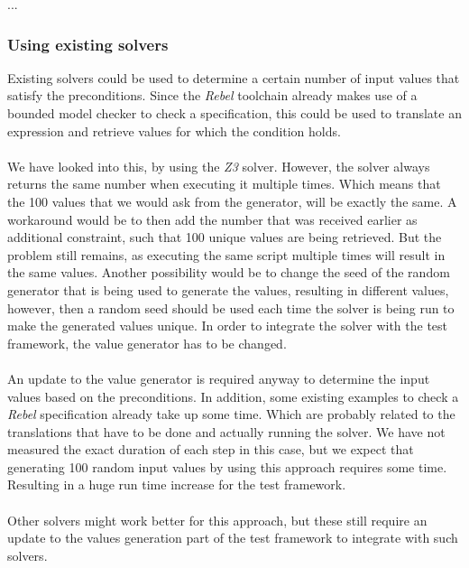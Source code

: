 ...
\subsubsection{Using existing solvers}
Existing solvers could be used to determine a certain number of input values
that satisfy the preconditions. Since the \textit{Rebel} toolchain already makes
use of a bounded model checker to check a specification, this could be used to
translate an expression and retrieve values for which the condition holds.\\
\\
We have looked into this, by using the \textit{Z3} solver. However, the solver
always returns the same number when executing it multiple times. Which means
that the 100 values that we would ask from the generator, will be exactly the
same. A workaround would be to then add the number that was received earlier as
additional constraint, such that 100 unique values are being retrieved. But the
problem still remains, as executing the same script multiple times will result in
the same values. Another possibility would be to change the seed of the random generator that is being
used to generate the values, resulting in different values, however, then a random seed should be used each time the solver is being run to make the generated values unique. In order to integrate the solver with the test framework, the value generator has to be changed.\\
\\
An update to the value generator is required anyway to determine the input values based on the preconditions. In addition, some existing examples to check a \textit{Rebel} specification already take up some time. Which are probably related to the translations that have to be done and actually running the solver. We have not measured the exact duration of each step in this case, but we expect that generating 100 random input values by using this approach requires some time. Resulting in a huge run time increase for the test framework.\\
\\
Other solvers might work better for this approach, but these still require an update to the values generation part of the test framework to integrate with such solvers.


%
